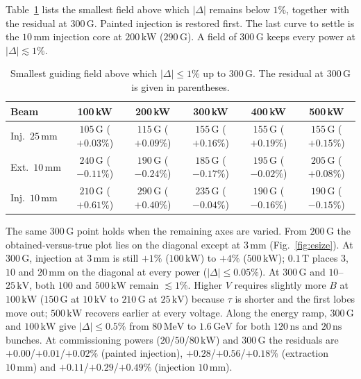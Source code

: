 \documentclass[hyperref]{cernrep}
\begin{document}
Table~\ref{tab:Bth} lists the smallest field above which
$\lvert\Delta\rvert$ remains below $1\%$, together with the residual at
$300\,\mathrm{G}$. Painted injection is restored first. The last curve
to settle is the $10\,\mathrm{mm}$ injection core at $200\,\mathrm{kW}$
($290\,\mathrm{G}$). A field of $300\,\mathrm{G}$ keeps every power at
$\lvert\Delta\rvert\lesssim 1\%$.

\begin{table}[htbp]
\centering
\caption{Smallest guiding field above which $\lvert\Delta\rvert\le 1\%$
up to $300\,\mathrm{G}$. The residual at
$300\,\mathrm{G}$ is given in parentheses.}
\label{tab:Bth}
{\small
\begin{tabular}{lccccc}
\hline\hline
Beam & 100\,kW & 200\,kW & 300\,kW & 400\,kW & 500\,kW \\
\hline
Inj.\ $25\,\mathrm{mm}$
  & $105\,\mathrm{G}$ ($+0.03\%$)
  & $115\,\mathrm{G}$ ($+0.09\%$)
  & $155\,\mathrm{G}$ ($+0.16\%$)
  & $155\,\mathrm{G}$ ($+0.19\%$)
  & $155\,\mathrm{G}$ ($+0.15\%$) \\
Ext.\ $10\,\mathrm{mm}$
  & $240\,\mathrm{G}$ ($-0.11\%$)
  & $190\,\mathrm{G}$ ($-0.24\%$)
  & $185\,\mathrm{G}$ ($-0.17\%$)
  & $195\,\mathrm{G}$ ($-0.02\%$)
  & $205\,\mathrm{G}$ ($+0.08\%$) \\
Inj.\ $10\,\mathrm{mm}$
  & $210\,\mathrm{G}$ ($+0.61\%$)
  & $290\,\mathrm{G}$ ($+0.40\%$)
  & $235\,\mathrm{G}$ ($-0.04\%$)
  & $190\,\mathrm{G}$ ($-0.16\%$)
  & $190\,\mathrm{G}$ ($-0.15\%$) \\
\hline\hline
\end{tabular}
}
\end{table}

The same $300\,\mathrm{G}$ point holds when the remaining axes are
varied. From $200\,\mathrm{G}$ the obtained-versus-true plot lies on
the diagonal except at $3\,\mathrm{mm}$ (Fig.~\ref{fig:esize}). At
$300\,\mathrm{G}$, injection at $3\,\mathrm{mm}$ is still $+1\%$
($100\,\mathrm{kW}$) to $+4\%$ ($500\,\mathrm{kW}$); $0.1\,\mathrm{T}$
places $3$, $10$ and $20\,\mathrm{mm}$ on the diagonal at every power
($\lvert\Delta\rvert\le 0.05\%$). At $300\,\mathrm{G}$ and
$10$--$25\,\mathrm{kV}$, both $100$ and $500\,\mathrm{kW}$ remain
$\lesssim 1\%$. Higher $V$ requires slightly more $B$ at
$100\,\mathrm{kW}$ ($150\,\mathrm{G}$ at $10\,\mathrm{kV}$ to
$210\,\mathrm{G}$ at $25\,\mathrm{kV}$) because $\tau$ is shorter and
the first lobes move out; $500\,\mathrm{kW}$ recovers earlier at every
voltage. Along the energy ramp, $300\,\mathrm{G}$ and
$100\,\mathrm{kW}$ give $\lvert\Delta\rvert\le 0.5\%$ from
$80\,\mathrm{MeV}$ to $1.6\,\mathrm{GeV}$ for both $120\,\mathrm{ns}$
and $20\,\mathrm{ns}$ bunches. At commissioning powers
($20$/$50$/$80\,\mathrm{kW}$) and $300\,\mathrm{G}$ the residuals are
$+0.00$/$+0.01$/$+0.02\%$ (painted injection),
$+0.28$/$+0.56$/$+0.18\%$ (extraction $10\,\mathrm{mm}$) and
$+0.11$/$+0.29$/$+0.49\%$ (injection $10\,\mathrm{mm}$).
\end{document}
